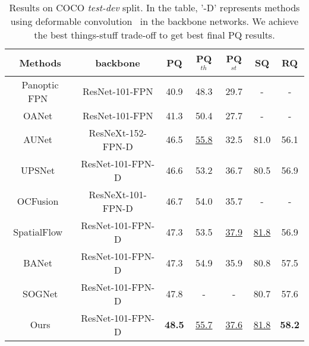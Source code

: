 \documentclass[letterpaper]{article} \usepackage{aaai21}  \usepackage{times}  \usepackage{helvet} \usepackage{courier}  \usepackage[hyphens]{url}  \usepackage{graphicx} \urlstyle{rm} \def\UrlFont{\rm}  \usepackage{natbib}  \usepackage{caption} \frenchspacing  \setlength{\pdfpagewidth}{8.5in}  \setlength{\pdfpageheight}{11in}
\begin{document}
\begin{table*}
  \begin{centering}
\tabcolsep 0.1in{\scriptsize{}}\begin{tabular}{c|c|ccc|cc}
  \hline 
  Methods & backbone & PQ & PQ$^{th}$ & PQ$^{st}$ & SQ & RQ\tabularnewline
  \hline 
  \hline 
Panoptic FPN~\cite{panopticFPNkirillov2019} & ResNet-101-FPN & 40.9 & 48.3 & 29.7 & - & -\tabularnewline
  OANet~\cite{oanetLiu2019} & ResNet-101-FPN & 41.3 & 50.4 & 27.7 & - & -\tabularnewline
AUNet~\cite{AunetLi_2019_} & ResNeXt-152-FPN-D & 46.5 & \underline{55.8} & 32.5 & 81.0 & 56.1\tabularnewline
  UPSNet~\cite{upsnetxiong2019} & ResNet-101-FPN-D & 46.6 & 53.2 & 36.7 & 80.5 & 56.9\tabularnewline
  OCFusion~\cite{lazarow2020learningocfusion} & ResNeXt-101-FPN-D & 46.7 & 54.0 & 35.7 & - & -\tabularnewline 
  SpatialFlow~\cite{spatialflowchen2019} & ResNet-101-FPN-D & 47.3 & 53.5 & \underline{37.9} & \underline{81.8} & 56.9\tabularnewline
  BANet~\cite{chen2020banet} & ResNet-101-FPN-D & 47.3 & 54.9 & 35.9 & 80.8 & 57.5\tabularnewline
  SOGNet\cite{yang2019sognet} & ResNet-101-FPN-D & 47.8 & - & - & 80.7 & 57.6\tabularnewline
  \hline 
  Ours & ResNet-101-FPN-D & \textbf{48.5} & \underline{55.7} & \underline{37.6} & \underline{81.8} & \textbf{58.2} \tabularnewline
  \hline 
  \end{tabular}{\scriptsize\par}
  \par\end{centering}


  \caption{\label{tab:Results on COCO test-dev} Results on COCO \textit{test-dev} split. 
  In the table, '-D' represents methods using deformable convolution~\cite{zhu2019deformablev2} in the backbone networks. 
We achieve the best things-stuff trade-off to get best final PQ results.}
\end{table*}
\end{document}

